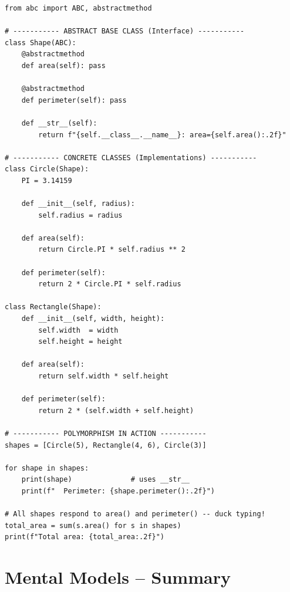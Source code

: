 \documentclass[12pt,a4paper]{article}
\begin{document}
\begin{lstlisting}
from abc import ABC, abstractmethod

# ----------- ABSTRACT BASE CLASS (Interface) -----------
class Shape(ABC):
    @abstractmethod
    def area(self): pass

    @abstractmethod
    def perimeter(self): pass

    def __str__(self):
        return f"{self.__class__.__name__}: area={self.area():.2f}"

# ----------- CONCRETE CLASSES (Implementations) -----------
class Circle(Shape):
    PI = 3.14159

    def __init__(self, radius):
        self.radius = radius

    def area(self):
        return Circle.PI * self.radius ** 2

    def perimeter(self):
        return 2 * Circle.PI * self.radius

class Rectangle(Shape):
    def __init__(self, width, height):
        self.width  = width
        self.height = height

    def area(self):
        return self.width * self.height

    def perimeter(self):
        return 2 * (self.width + self.height)

# ----------- POLYMORPHISM IN ACTION -----------
shapes = [Circle(5), Rectangle(4, 6), Circle(3)]

for shape in shapes:
    print(shape)              # uses __str__
    print(f"  Perimeter: {shape.perimeter():.2f}")

# All shapes respond to area() and perimeter() -- duck typing!
total_area = sum(s.area() for s in shapes)
print(f"Total area: {total_area:.2f}")
\end{lstlisting}

\section{Mental Models -- Summary}
\end{document}
